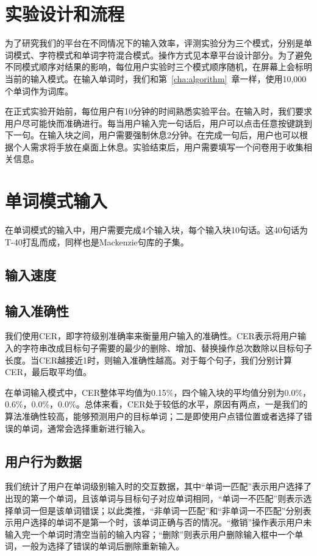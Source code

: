 \section{实验设计和流程}
为了研究我们的平台在不同情况下的输入效率，评测实验分为三个模式，分别是单词模式、字符模式和单词字符混合模式。操作方式见本章平台设计部分。为了避免不同模式顺序对结果的影响，每位用户实验时三个模式顺序随机，在屏幕上会标明当前的输入模式。在输入单词时，我们和第~\ref{cha:algorithm}~章一样，使用10,000个单词作为词库。

在正式实验开始前，每位用户有10分钟的时间熟悉实验平台。在输入时，我们要求用户尽可能快而准确进行。每当用户输入完一句话后，用户可以点击任意按键跳到下一句。在输入块之间，用户需要强制休息2分钟。在完成一句后，用户也可以根据个人需求将手放在桌面上休息。实验结束后，用户需要填写一个问卷用于收集相关信息。


\section{单词模式输入}
在单词模式的输入中，用户需要完成4个输入块，每个输入块10句话。这40句话为T-40\cite{t40}打乱而成，同样也是Mackenzie句库的子集\cite{mackenzie2003phrase}。

\subsection{输入速度}
\subsection{输入准确性}
我们使用CER\cite{cer}，即字符级别准确率来衡量用户输入的准确性。CER表示将用户输入的字符串改成目标句子需要的最少的删除、增加、替换操作总次数除以目标句子长度。当CER越接近1时，则输入准确性越高。对于每个句子，我们分别计算CER，最后取平均值。

在单词输入模式中，CER整体平均值为0.15\%，四个输入块的平均值分别为0.0\%，0.6\%，0.0\%，0.0\%。总体来看，CER处于较低的水平，原因有两点，一是我们的算法准确性较高，能够预测用户的目标单词；二是即使用户点错位置或者选择了错误的单词，通常会选择重新进行输入。

\subsection{用户行为数据}
我们统计了用户在单词级别输入时的交互数据，其中“单词一匹配”表示用户选择了出现的第一个单词，且该单词与目标句子对应单词相同，“单词一不匹配”则表示选择单词一但是该单词错误；以此类推，“非单词一匹配”和“非单词一不匹配”分别表示用户选择的单词不是第一个时，该单词正确与否的情况。“撤销”操作表示用户未输入完一个单词时清空当前的输入内容；“删除”则表示用户删除输入框中一个单词，一般为选择了错误的单词后删除重新输入。

